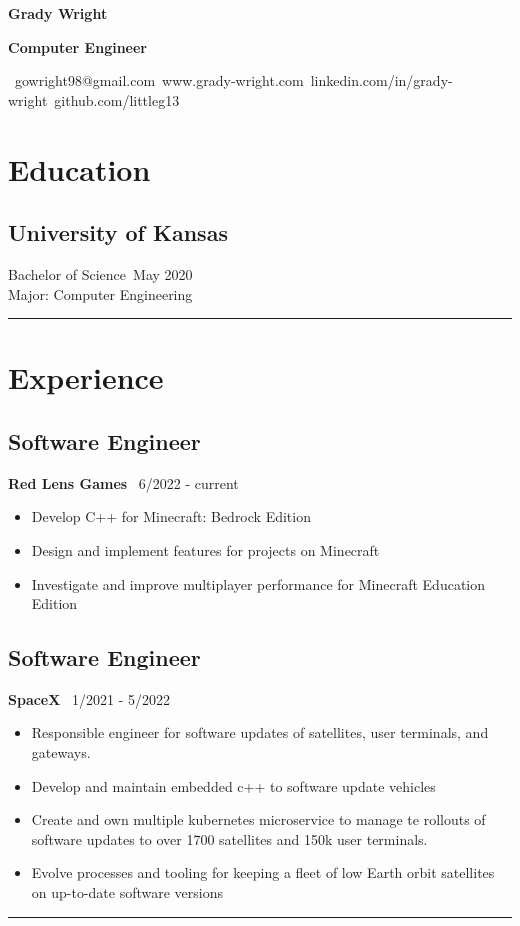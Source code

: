 \documentclass[11pt, letterpaper]{article}
\newenvironment{desItemize}
{ \begin{itemize}[leftmargin=*, topsep=1pt]
    \setlength{\itemsep}{0pt}
    \setlength{\parskip}{0pt}
    \setlength{\parsep}{0pt}
    \small     }
{ \end{itemize}                  }
\newenvironment{leftSection}[1]
{\section*{#1}}
{\rule{\columnwidth + \columnsep/2}{1pt}}
\begin{document}
{\noindent\hspace{-1mm}\Huge\textbf{Grady Wright}\par}
{\vspace{2mm}\noindent\Large\textbf{Computer Engineer}\par}
{\vspace{2mm}\noindent\small\faEnvelope\ gowright98@gmail.com\hfill \faExternalLinkSquare\ www.grady-wright.com\hfill \faLinkedin\ linkedin.com/in/grady-wright\hfill \faGithub\ github.com/littleg13}
\normalsize\vspace{3mm}
\begin{multicols*}{2}[]
    \raggedcolumns
\begin{leftSection}{Education}
    \subsection*{University of Kansas}
    Bachelor of Science\hfill\faCalendar\ May 2020\\
    Major: Computer Engineering \hfill\\
\end{leftSection}
\begin{leftSection}{Experience}
    \subsection*{Software Engineer}
    \textbf{Red Lens Games}\hfill
    \faCalendar\ 6/2022 - current
    \begin{desItemize}
        \item   Develop C++ for Minecraft: Bedrock Edition
        \item   Design and implement features for projects on Minecraft
        \item   Investigate and improve multiplayer performance for Minecraft Education Edition
    \end{desItemize}
    \subsection*{Software Engineer}
    \textbf{SpaceX}\hfill
    \faCalendar\ 1/2021 - 5/2022
    \begin{desItemize}
        \item   Responsible engineer for software updates of satellites, user terminals, and gateways.
        \item   Develop and maintain embedded c++ to software update vehicles
        \item   Create and own multiple kubernetes microservice to manage te rollouts of software updates to over 1700 satellites and 150k user terminals.
        \item   Evolve processes and tooling for keeping a fleet of low Earth orbit satellites on up-to-date software versions
    \end{desItemize}

\end{leftSection}
\end{multicols*}
\end{document}
